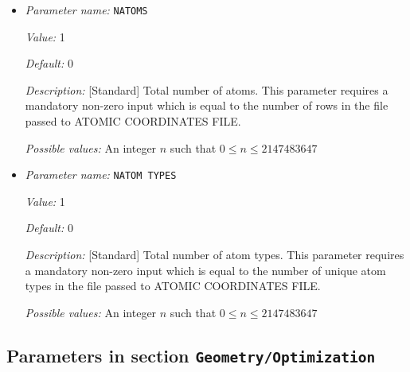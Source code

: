 \begin{itemize}
{\it Possible values:} Any string
\item {\it Parameter name:} {\tt NATOMS}
\label{parameters:Geometry/NATOMS}


{\it Value:} 1


{\it Default:} 0


{\it Description:} [Standard] Total number of atoms. This parameter requires a mandatory non-zero input which is equal to the number of rows in the file passed to ATOMIC COORDINATES FILE.


{\it Possible values:} An integer $n$ such that $0\leq n \leq 2147483647$
\item {\it Parameter name:} {\tt NATOM TYPES}
\label{parameters:Geometry/NATOM TYPES}
\label{parameters:Geometry/NATOM_20TYPES}


{\it Value:} 1


{\it Default:} 0


{\it Description:} [Standard] Total number of atom types. This parameter requires a mandatory non-zero input which is equal to the number of unique atom types in the file passed to ATOMIC COORDINATES FILE.


{\it Possible values:} An integer $n$ such that $0\leq n \leq 2147483647$
\end{itemize}



\subsection{Parameters in section \tt Geometry/Optimization}
\label{parameters:Geometry/Optimization}

